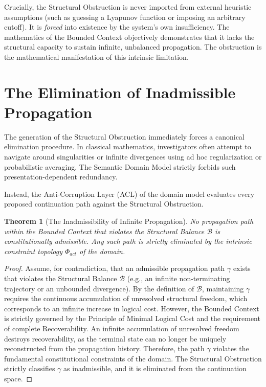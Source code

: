 \documentclass[12pt,openany]{extbook}
\theoremstyle{plain}
\newtheorem{theorem}{Theorem}[chapter]
\theoremstyle{definition}
\begin{document}
Crucially, the Structural Obstruction is never imported from external heuristic assumptions (such as guessing a Lyapunov function or imposing an arbitrary cutoff). It is \emph{forced} into existence by the system's own insufficiency. The mathematics of the Bounded Context objectively demonstrates that it lacks the structural capacity to sustain infinite, unbalanced propagation. The obstruction is the mathematical manifestation of this intrinsic limitation.

\section{The Elimination of Inadmissible Propagation}

The generation of the Structural Obstruction immediately forces a canonical elimination procedure. In classical mathematics, investigators often attempt to navigate around singularities or infinite divergences using ad hoc regularization or probabilistic averaging. The Semantic Domain Model strictly forbids such presentation-dependent redundancy.

Instead, the Anti-Corruption Layer (ACL) of the domain model evaluates every proposed continuation path against the Structural Obstruction. 

\begin{theorem}[The Inadmissibility of Infinite Propagation]
No propagation path within the Bounded Context that violates the Structural Balance $\mathcal{B}$ is constitutionally admissible. Any such path is strictly eliminated by the intrinsic constraint topology $\Phi_{act}$ of the domain.
\end{theorem}

\begin{proof}
Assume, for contradiction, that an admissible propagation path $\gamma$ exists that violates the Structural Balance $\mathcal{B}$ (e.g., an infinite non-terminating trajectory or an unbounded divergence). 
By the definition of $\mathcal{B}$, maintaining $\gamma$ requires the continuous accumulation of unresolved structural freedom, which corresponds to an infinite increase in logical cost. 
However, the Bounded Context is strictly governed by the Principle of Minimal Logical Cost and the requirement of complete Recoverability. An infinite accumulation of unresolved freedom destroys recoverability, as the terminal state can no longer be uniquely reconstructed from the propagation history.
Therefore, the path $\gamma$ violates the fundamental constitutional constraints of the domain. The Structural Obstruction strictly classifies $\gamma$ as inadmissible, and it is eliminated from the continuation space.
\end{proof}
\end{document}
